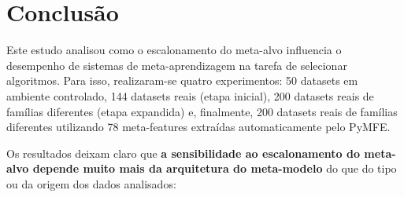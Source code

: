 \documentclass[12pt]{article}
\begin{document}
\begin{table}[ht]
\centering
\caption{Consistência dos achados ao longo dos quatro experimentos.}
\label{tab:consistency}
%
\end{table}

\section{Conclusão}

Este estudo analisou como o escalonamento do meta-alvo influencia o desempenho de sistemas de meta-aprendizagem na tarefa de selecionar algoritmos. Para isso, realizaram-se quatro experimentos: 50 datasets em ambiente controlado, 144 datasets reais (etapa inicial), 200 datasets reais de famílias diferentes (etapa expandida) e, finalmente, 200 datasets reais de famílias diferentes utilizando 78 meta-features extraídas automaticamente pelo PyMFE.

Os resultados deixam claro que \textbf{a sensibilidade ao escalonamento do meta-alvo depende muito mais da arquitetura do meta-modelo} do que do tipo ou da origem dos dados analisados:
\end{document}
